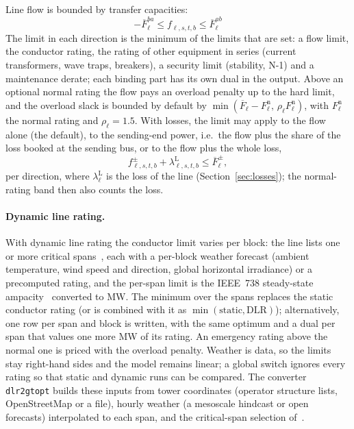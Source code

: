 Line flow is bounded by transfer capacities:
\begin{equation}
-\overline{F}^{ba}_\ell \leq f_{\ell,s,t,b}
  \leq \overline{F}^{ab}_\ell
\end{equation}
The limit in each direction is the minimum of the limits that are set:
a flow limit, the conductor rating, the rating of other equipment in
series (current transformers, wave traps, breakers), a security limit
(stability, N-1) and a maintenance derate; each binding part has its
own dual in the output.  Above an optional normal rating the flow pays
an overload penalty up to the hard limit, and the overload slack is
bounded by default by $\min(\overline{F}_\ell - F^\text{n}_\ell,\,
\rho_\ell F^\text{n}_\ell)$, with $F^\text{n}_\ell$ the normal rating
and $\rho_\ell = 1.5$.  With losses, the limit may apply to the flow
alone (the default), to the sending-end power, i.e.\ the flow plus the
share of the loss booked at the sending bus, or to the flow plus the
whole loss,
\begin{equation}
\label{eq:thermal_full}
f^{\pm}_{\ell,s,t,b} + \lambda^{\mathrm{L}}_{\ell,s,t,b}
  \leq \overline{F}^{\pm}_\ell ,
\end{equation}
per direction, where $\lambda^{\mathrm{L}}_\ell$ is the loss of the
line (Section~\ref{sec:losses}); the normal-rating band then also
counts the loss.

\paragraph{Dynamic line rating.}
With dynamic line rating the conductor limit varies per block: the line
lists one or more critical spans~\cite{matus2012criticalspans}, each
with a per-block weather forecast (ambient temperature, wind speed and
direction, global horizontal irradiance) or a precomputed rating, and
the per-span limit is the IEEE~738 steady-state
ampacity~\cite{ieee738_2012} converted to MW.  The minimum over the
spans replaces the static conductor rating (or is combined with it as
$\min(\text{static}, \text{DLR})$); alternatively, one row per span and
block is written, with the same optimum and a dual per span that values
one more MW of its rating.  An emergency rating above the normal one
is priced with the overload penalty.  Weather is data, so the limits
stay right-hand sides and the model remains linear; a global switch
ignores every rating so that static and dynamic runs can be compared.
The converter \texttt{dlr2gtopt} builds these inputs from tower
coordinates (operator structure lists, OpenStreetMap or a file),
hourly weather (a mesoscale hindcast or open forecasts) interpolated to
each span, and the critical-span selection
of~\cite{matus2012criticalspans}.

